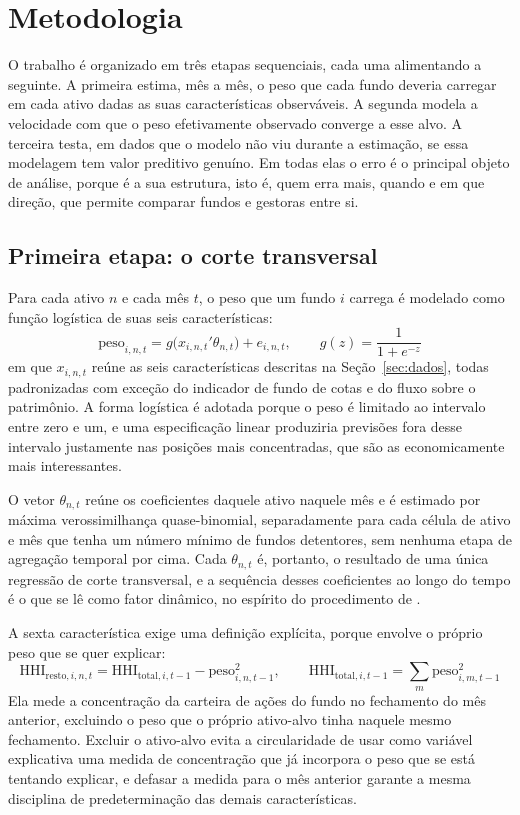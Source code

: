 \documentclass[12pt,a4paper]{article}
\begin{document}
\section{Metodologia}
\label{sec:metodologia}

O trabalho é organizado em três etapas sequenciais, cada uma alimentando a seguinte. A
primeira estima, mês a mês, o peso que cada fundo deveria carregar em cada ativo dadas as
suas características observáveis. A segunda modela a velocidade com que o peso efetivamente
observado converge a esse alvo. A terceira testa, em dados que o modelo não viu durante a
estimação, se essa modelagem tem valor preditivo genuíno. Em todas elas o erro é o principal
objeto de análise, porque é a sua estrutura, isto é, quem erra mais, quando e em que
direção, que permite comparar fundos e gestoras entre si.

\subsection{Primeira etapa: o corte transversal}

Para cada ativo $n$ e cada mês $t$, o peso que um fundo $i$ carrega é modelado como função
logística de suas seis características:
\begin{equation}
\text{peso}_{i,n,t} = g\big(x_{i,n,t}'\theta_{n,t}\big) + e_{i,n,t}, \qquad
g(z) = \frac{1}{1+e^{-z}}
\label{eq:cs}
\end{equation}
em que $x_{i,n,t}$ reúne as seis características descritas na Seção~\ref{sec:dados}, todas
padronizadas com exceção do indicador de fundo de cotas e do fluxo sobre o patrimônio. A
forma logística é adotada porque o peso é limitado ao intervalo entre zero e um, e uma
especificação linear produziria previsões fora desse intervalo justamente nas posições mais
concentradas, que são as economicamente mais interessantes.

O vetor $\theta_{n,t}$ reúne os coeficientes daquele ativo naquele mês e é estimado por
máxima verossimilhança quase-binomial, separadamente para cada célula de ativo e mês que
tenha um número mínimo de fundos detentores, sem nenhuma etapa de agregação temporal por
cima. Cada $\theta_{n,t}$ é, portanto, o resultado de uma única regressão de corte
transversal, e a sequência desses coeficientes ao longo do tempo é o que se lê como fator
dinâmico, no espírito do procedimento de .

A sexta característica exige uma definição explícita, porque envolve o próprio peso que se
quer explicar:
\begin{equation}
\text{HHI}_{\text{resto},i,n,t} = \text{HHI}_{\text{total},i,t-1} - \text{peso}_{i,n,t-1}^2,
\qquad \text{HHI}_{\text{total},i,t-1} = \sum_{m} \text{peso}_{i,m,t-1}^2
\label{eq:hhi-resto}
\end{equation}
Ela mede a concentração da carteira de ações do fundo no fechamento do mês anterior,
excluindo o peso que o próprio ativo-alvo tinha naquele mesmo fechamento. Excluir o
ativo-alvo evita a circularidade de usar como variável explicativa uma medida de
concentração que já incorpora o peso que se está tentando explicar, e defasar a medida para
o mês anterior garante a mesma disciplina de predeterminação das demais características.
\end{document}
